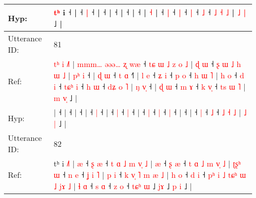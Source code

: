 \documentclass[10pt]{article}
\DeclareRobustCommand{\hl}[1]{{\textcolor{red}{#1}}}
\begin{document}
\begin{longtable}{ll}
 \\
Hyp: & \hl{}\hl{}\hl{}\hl{}\hl{}\hl{}\hl{}\hl{}\hl{}\hl{}\hl{}\hl{}\hl{}\hl{}\hl{}\hl{}\hl{}\hl{}\hl{}\hl{}\hl{}\hl{}\hl{}\hl{}\hl{}\hl{t}\hl{ʰ} i ˧\hl{}\hl{}\hl{}\hl{}\hl{}\hl{}\hl{}\hl{}\hl{}\hl{}\hl{}\hl{}\hl{}\hl{}\hl{}\hl{}\hl{}\hl{}\hl{} |\hl{}\hl{} ˧\hl{}\hl{} \hl{|} ˧\hl{}\hl{}\hl{}\hl{}\hl{}\hl{}\hl{}\hl{}\hl{}\hl{}\hl{}\hl{} |\hl{}\hl{}\hl{}\hl{} ˧ |\hl{}\hl{}\hl{}\hl{} ˧\hl{}\hl{}\hl{}\hl{}\hl{}\hl{} |\hl{}\hl{}\hl{}\hl{} ˧ |\hl{}\hl{}\hl{}\hl{} ˧\hl{}\hl{}\hl{}\hl{}\hl{}\hl{} |\hl{}\hl{}\hl{}\hl{}\hl{} \hl{˧} |\hl{}\hl{}\hl{}\hl{} ˧\hl{}\hl{} \hl{|} ˧\hl{}\hl{}\hl{}\hl{} \hl{|} ˧\hl{}\hl{} \hl{|} ˧\hl{}\hl{} \hl{}\hl{˩} ˧ \hl{}\hl{˩} \hl{˧} \hl{˩} | \hl{˩} \hl{}\hl{|} ˩ |
 \\
\midrule
Utterance ID: & 81 \\
Ref: & \hl{t}\hl{ʰ}\hl{ }\hl{i}\hl{ }\hl{˩}\hl{˥}\hl{ }|\hl{ }\hl{m}\hl{m}\hl{m}\hl{…}\hl{ }\hl{ə}\hl{ə}\hl{ə}\hl{…}\hl{ }\hl{ʐ}\hl{ }\hl{w}\hl{æ} ˧\hl{ }\hl{t}\hl{ɕ}\hl{ }\hl{ɯ}\hl{ }\hl{˩}\hl{ }\hl{z}\hl{ }\hl{o}\hl{ }\hl{˩} |\hl{ }\hl{ɖ}\hl{ }\hl{ɯ} ˧\hl{ }\hl{ʂ}\hl{ }\hl{ɯ}\hl{ }\hl{˩}\hl{ }\hl{h}\hl{ }\hl{ɯ}\hl{ }\hl{˩} |\hl{ }\hl{p}\hl{ʰ}\hl{ }\hl{i} ˧ |\hl{ }\hl{ɖ}\hl{ }\hl{ɯ} ˧\hl{ }\hl{t} \hl{ɑ} ˧\hl{˥} |\hl{ }\hl{l}\hl{ }\hl{e} ˧\hl{ }\hl{ʑ} \hl{i} ˧\hl{ }\hl{p} \hl{o} ˧\hl{ }\hl{h}\hl{ }\hl{ɯ}\hl{ }\hl{˥} |\hl{ }\hl{h}\hl{ }\hl{o} ˧\hl{ }\hl{d} \hl{i} ˧\hl{ }\hl{t}\hl{ɕ}\hl{ʰ} \hl{i} ˧\hl{ }\hl{h} \hl{ɯ} ˧\hl{ }\hl{d}\hl{ʑ}\hl{ }\hl{o}\hl{ }\hl{˥} |\hl{ }\hl{ŋ}\hl{ }\hl{v}\hl{̩} ˧ |\hl{ }\hl{ɖ}\hl{ }\hl{ɯ} ˧\hl{ }\hl{m} \hl{ɤ} ˧\hl{ }\hl{k} \hl{v}\hl{̩} ˧ \hl{t}\hl{s} \hl{ɯ} \hl{˥} | \hl{m} \hl{v}\hl{̩} ˩ |
 \\
Hyp: & \hl{}\hl{}\hl{}\hl{}\hl{}\hl{}\hl{}\hl{}|\hl{}\hl{}\hl{}\hl{}\hl{}\hl{}\hl{}\hl{}\hl{}\hl{}\hl{}\hl{}\hl{}\hl{}\hl{} ˧\hl{}\hl{}\hl{}\hl{}\hl{}\hl{}\hl{}\hl{}\hl{}\hl{}\hl{}\hl{}\hl{} |\hl{}\hl{}\hl{}\hl{} ˧\hl{}\hl{}\hl{}\hl{}\hl{}\hl{}\hl{}\hl{}\hl{}\hl{}\hl{}\hl{} |\hl{}\hl{}\hl{}\hl{}\hl{} ˧ |\hl{}\hl{}\hl{}\hl{} ˧\hl{}\hl{} \hl{|} ˧\hl{} |\hl{}\hl{}\hl{}\hl{} ˧\hl{}\hl{} \hl{|} ˧\hl{}\hl{} \hl{|} ˧\hl{}\hl{}\hl{}\hl{}\hl{}\hl{} |\hl{}\hl{}\hl{}\hl{} ˧\hl{}\hl{} \hl{|} ˧\hl{}\hl{}\hl{}\hl{} \hl{|} ˧\hl{}\hl{} \hl{|} ˧\hl{}\hl{}\hl{}\hl{}\hl{}\hl{}\hl{} |\hl{}\hl{}\hl{}\hl{}\hl{} ˧ |\hl{}\hl{}\hl{}\hl{} ˧\hl{}\hl{} \hl{|} ˧\hl{}\hl{} \hl{}\hl{˩} ˧ \hl{}\hl{˩} \hl{˧} \hl{˩} | \hl{˩} \hl{}\hl{|} ˩ |
 \\
\midrule
Utterance ID: & 82 \\
Ref: & tʰ i \hl{˩}\hl{˥} |\hl{ }\hl{æ} ˧\hl{ }\hl{ʂ} \hl{æ} ˧\hl{ }\hl{t}\hl{ }\hl{ɑ}\hl{ }\hl{˩}\hl{ }\hl{m}\hl{ }\hl{v}\hl{̩}\hl{ }\hl{˩} |\hl{ }\hl{æ} ˧\hl{ }\hl{ʂ} \hl{æ} ˧\hl{ }\hl{t}\hl{ }\hl{ɑ}\hl{ }\hl{˩}\hl{ }\hl{m}\hl{ }\hl{v}\hl{̩}\hl{ }\hl{˩} |\hl{ }\hl{ʈ}\hl{ʂ}\hl{ʰ}\hl{ }\hl{ɯ} ˧\hl{ }\hl{n} \hl{e} ˧\hl{ }\hl{ʝ}\hl{ }\hl{i}\hl{ }\hl{˥} |\hl{ }\hl{p}\hl{ }\hl{i} ˧\hl{ }\hl{k}\hl{ }\hl{v}\hl{̩}\hl{ }\hl{˥}\hl{ }\hl{m}\hl{ }\hl{æ}\hl{ }\hl{˩} |\hl{ }\hl{h}\hl{ }\hl{o} ˧\hl{ }\hl{d} \hl{i} ˧\hl{ }\hl{p}\hl{ʰ}\hl{ }\hl{i}\hl{ }\hl{˩}\hl{ }\hl{t}\hl{ɕ}\hl{ʰ}\hl{ }\hl{ɯ}\hl{ }\hl{˩}\hl{ }\hl{j}\hl{ɤ}\hl{ }\hl{˩} |\hl{ }\hl{ɬ}\hl{ }\hl{ɑ} ˧\hl{ }\hl{s} \hl{ɑ} ˧\hl{ }\hl{z} \hl{o} ˧ \hl{t}\hl{ɕ}\hl{ʰ} \hl{ɯ} ˩ \hl{j}\hl{ɤ} ˩\hl{ }\hl{p} \hl{i} ˩ |

\end{longtable}
\end{document}
